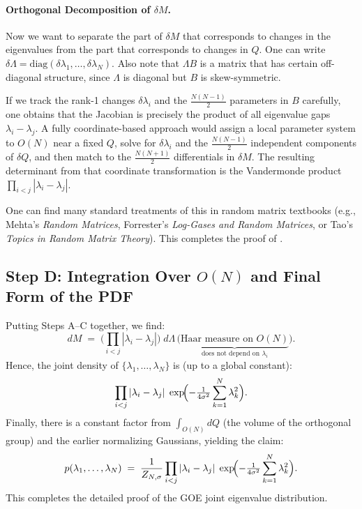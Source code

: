\documentclass[letterpaper,11pt,oneside,reqno]{article}
\numberwithin{equation}{section}
\theoremstyle{definition}
\begin{document}
\paragraph{Orthogonal Decomposition of \(\delta M\).}
Now we want to separate the part of \(\delta M\) that corresponds to changes in the eigenvalues from the part that corresponds to changes in \(Q\). One can write \(\delta\Lambda = \mathrm{diag}(\delta\lambda_1,\dots,\delta\lambda_N)\). Also note that \(\Lambda B\) is a matrix that has certain off-diagonal structure, since \(\Lambda\) is diagonal but \(B\) is skew-symmetric.

If we track the rank-1 changes \(\delta\lambda_i\) and the \(\tfrac{N(N-1)}{2}\) parameters in \(B\) carefully, one obtains that the Jacobian is precisely the product of all eigenvalue gaps \(\lambda_i-\lambda_j\). A fully coordinate-based approach would assign a local parameter system to \(O(N)\) near a fixed \(Q\), solve for \(\delta\lambda_i\) and the \(\tfrac{N(N-1)}{2}\) independent components of \(\delta Q\), and then match to the \(\tfrac{N(N+1)}{2}\) differentials in \(\delta M\). The resulting determinant from that coordinate transformation is the Vandermonde product
\(\prod_{i<j}|\lambda_i-\lambda_j|\).

One can find many standard treatments of this in random matrix textbooks (e.g., Mehta’s \emph{Random Matrices}, Forrester’s \emph{Log-Gases and Random Matrices}, or Tao’s \emph{Topics in Random Matrix Theory}). This completes the proof of .

\subsection{Step D: Integration Over \(O(N)\) and Final Form of the PDF}

Putting Steps A--C together, we find:
\[
  dM
  \;=\;
  \biggl(\prod_{i<j}|\lambda_i-\lambda_j|\biggr)\;
  d\Lambda
  \,\bigl(\underbrace{\text{Haar measure on }O(N)}_{\text{does not depend on }\lambda_i}\bigr).
\]
Hence, the joint density of \(\{\lambda_1,\dots,\lambda_N\}\) is (up to a global constant):
\[
  \prod_{i<j}|\lambda_i-\lambda_j|\;
  \exp\!\Bigl(-\tfrac{1}{4\sigma^2}\sum_{k=1}^N \lambda_k^2\Bigr).
\]
Finally, there is a constant factor from \(\int_{O(N)} dQ\) (the volume of the orthogonal group) and the earlier normalizing Gaussians, yielding the claim:
\[
  p(\lambda_1,\dots,\lambda_N)
  \;=\;
  \frac{1}{Z_{N,\sigma}}
  \prod_{i<j}|\lambda_i-\lambda_j|\;
  \exp\!\Bigl(-\tfrac{1}{4\sigma^2}\sum_{k=1}^N \lambda_k^2\Bigr).
\]
This completes the detailed proof of the GOE joint eigenvalue distribution.
\end{document}
